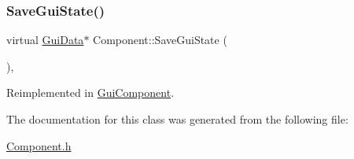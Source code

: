 \subsubsection{\texorpdfstring{SaveGuiState()}{SaveGuiState()}}
{\footnotesize\ttfamily virtual \mbox{\hyperlink{class_gui_data}{Gui\+Data}}$\ast$ Component\+::\+Save\+Gui\+State (\begin{DoxyParamCaption}{ }\end{DoxyParamCaption})\hspace{0.3cm}{\ttfamily [inline]}, {\ttfamily [virtual]}}



Reimplemented in \mbox{\hyperlink{class_gui_component_af41e8f80eeca9b258649c7579a7e8c5c}{Gui\+Component}}.



The documentation for this class was generated from the following file\+:\begin{DoxyCompactItemize}
\item 
\mbox{\hyperlink{_component_8h}{Component.\+h}}\end{DoxyCompactItemize}
